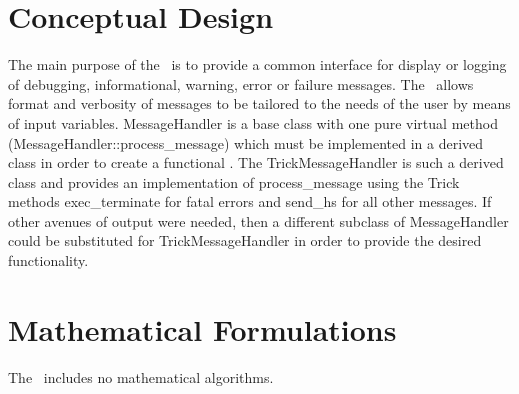 \section{Conceptual Design}
The main purpose of the \MessageHandlerDesc\ is to provide a common interface
for display or logging of debugging, informational, warning, error or failure messages.  
The \MessageHandlerDesc\ allows format and verbosity of messages to be
tailored to the needs of the user by means of input variables.  
MessageHandler is a base class with one pure virtual method 
(MessageHandler::process\_message) which must be implemented in a derived
class in order to create a functional \MessageHandlerDesc.  The 
TrickMessageHandler is such a derived class and
provides an implementation of process\_message using the Trick methods
exec\_terminate for fatal errors and send\_hs for all other messages.
If other avenues of output were needed, then a different subclass of
MessageHandler could be substituted for TrickMessageHandler in order
to provide the desired functionality.



\section{Mathematical Formulations}
The \MessageHandlerDesc\ includes no mathematical algorithms.
